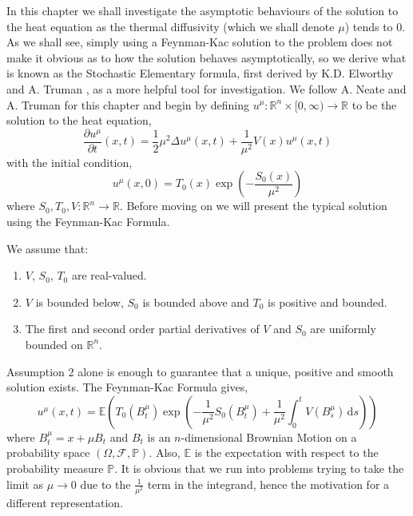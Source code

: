 \documentclass[a4paper,12pt,draft]{report}
\begin{document}
In this chapter we shall investigate the asymptotic behaviours of the solution to the heat equation as the thermal diffusivity (which we shall denote $\mu$) tends to $0$.  As we shall see, simply using a Feynman-Kac solution to the problem does not make it obvious as to how the solution behaves asymptotically, so we derive what is known as the Stochastic Elementary formula, first derived by K.D. Elworthy and A. Truman \cite{SEF4}, as a more helpful tool for investigation.  We follow A. Neate and A. Truman \cite{ANAT} for this chapter and begin by defining $u^{\mu} : \mathbb{R}^n \times [0, \infty) \to \mathbb{R}$ to be the solution to the heat equation,
\begin{equation}
\frac{\partial u^{\mu}}{\partial t}(x, t) = \frac{1}{2}\mu^2\Delta u^{\mu}(x, t) + \frac{1}{\mu^2}V(x)u^{\mu}(x, t) \label{HE}
\end{equation}
with the initial condition,
$$
u^{\mu}(x, 0) = T_{0}(x)\exp\left(-\frac{S_{0}(x)}{\mu^2}\right)
$$
where $S_{0}, T_{0}, V:\mathbb{R}^n \to \mathbb{R}$.
Before moving on we will present the typical solution using the Feynman-Kac Formula.

\assumption
{
We assume that:
\begin{enumerate}
\item $V$, $S_0$, $T_0$ are real-valued.
\item $V$ is bounded below, $S_0$ is bounded above and $T_0$ is positive and bounded.
\item The first and second order partial derivatives of $V$ and $S_0$ are uniformly bounded on $\mathbb{R}^n$.
\end{enumerate}
}

Assumption 2 alone is enough to guarantee that a unique, positive and smooth solution exists.  The Feynman-Kac Formula gives,
$$
u^{\mu}(x, t) = \mathbb{E}\left(T_{0}(B^{\mu}_t)\exp\left(-\frac{1}{\mu^2}S_{0}(B^{\mu}_t) + \frac{1}{\mu^2}\int_{0}^{t}V(B^{\mu}_s)\,\mathrm{d}s\right)\right)
$$
where $B^{\mu}_t = x + \mu B_{t}$ and $B_{t}$ is an $n$-dimensional Brownian Motion on a probability space $(\Omega, \mathscr{F}, \mathbb{P})$.  Also, $\mathbb{E}$ is the expectation with respect to the probability measure $\mathbb{P}$.  It is obvious that we run into problems trying to take the limit as $\mu \to 0$ due to the $\frac{1}{\mu^2}$ term in the integrand, hence the motivation for a different representation.
\end{document}
